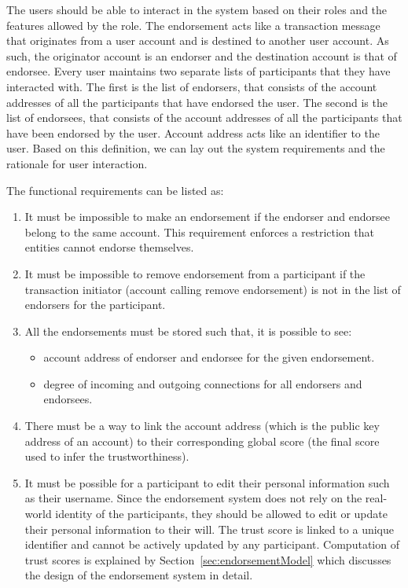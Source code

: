 The users should be able to interact in the system based on their roles and the
features allowed by the role. The endorsement acts like a transaction message
that originates from a user account and is destined to another user account. As
such, the originator account is an endorser and the destination account is that
of endorsee. Every user maintains two separate lists of participants that they
have interacted with. The first is the list of endorsers, that consists of the
account addresses of all the participants that have endorsed the user. The
second is the list of endorsees, that consists of the account addresses of all
the participants that have been endorsed by the user. Account address acts like
an identifier to the user. Based on this definition, we can lay out the system
requirements and the rationale for user interaction. \par
The functional requirements can be listed as: 
\begin{enumerate}
	\item It must be impossible to make an endorsement if the endorser and
		endorsee belong to the same account. \newline
		This requirement enforces a restriction that entities cannot endorse
		themselves.  
	\item It must be impossible to remove endorsement from a participant if the
		transaction initiator (account calling remove endorsement) is not in
		the list of endorsers for the participant.
	\item All the endorsements must be stored such that, it is possible to see: 
		\begin{itemize}
			\item account address of endorser and endorsee for the given
				endorsement. 
			\item degree of incoming and outgoing connections for all endorsers
				and endorsees.
		\end{itemize}
	\item There must be a way to link the account address (which is the public
		key address of an account) to their corresponding global score (the
		final score used to infer the trustworthiness).
	\item It must be possible for a participant to edit their personal
		information such as their username. \newline
		Since the endorsement system does not rely on the real-world identity
		of the participants, they should be allowed to edit or update their
		personal information to their will. The trust score is linked to a
		unique identifier and cannot be actively updated by any participant.
		Computation of trust scores is explained by
		Section~\ref{sec:endorsementModel} which discusses the design of the
		endorsement system in detail. 
\end{enumerate}
